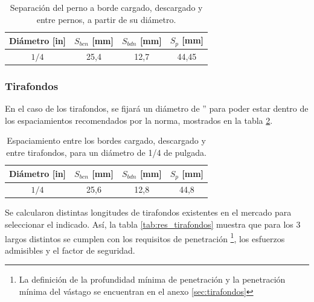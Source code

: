 \begin{table}[h]
\centering
\begin{tabular}{@{}cccc@{}}
\toprule
Diámetro [in] & $S_{bcn}$ [mm] & $S_{bdn}$ [mm] & $S_p$ [mm] \\ \midrule
$1/4$ & 25,4 & 12,7 & 44,45 \\ \bottomrule
\end{tabular}
\caption{Separación del perno a borde cargado, descargado y entre pernos, a partir de su diámetro.}
\label{tab:res_seppernos}
\end{table}

\subsubsection{Tirafondos}

En el caso de los tirafondos, se fijará un diámetro de '' para poder estar dentro de los espaciamientos recomendados por la norma, mostrados en la tabla \ref{tab:res_septirafondo}. 

\begin{table}[h]
\centering
\begin{tabular}{@{}cccc@{}}
\toprule
Diámetro [in] & $S_{bcn}$ [mm] & $S_{bdn}$ [mm] & $S_p$ [mm] \\ \midrule
$1/4$ & 25,6 & 12,8 & 44,8 \\ \bottomrule
\end{tabular}
\caption{Espaciamiento entre los bordes cargado, descargado y entre tirafondos, para un diámetro de 1/4 de pulgada.}
\label{tab:res_septirafondo}
\end{table}

Se calcularon distintas longitudes de tirafondos existentes en el mercado para seleccionar el indicado. Así, la tabla \ref{tab:res_tirafondos} muestra que para los 3 largos distintos se cumplen con los requisitos de penetración \footnote{La definición de la profundidad mínima de penetración y la penetración mínima del vástago se encuentran en el anexo \ref{sec:tirafondos}}, los esfuerzos admisibles y el factor de seguridad.

